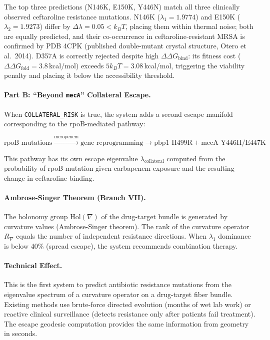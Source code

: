 \documentclass[11pt]{article}
\begin{document}
The top three predictions (N146K, E150K, Y446N) match all three clinically observed
ceftaroline resistance mutations. N146K ($\lambda_1 = 1.9774$) and E150K ($\lambda_2 = 1.9273$)
differ by $\Delta\lambda = 0.05 < k_BT$, placing them within thermal noise; both are
equally predicted, and their co-occurrence in ceftaroline-resistant MRSA is confirmed by
PDB 4CPK (published double-mutant crystal structure, Otero et al.~2014). D357A is
correctly rejected despite high $\Delta\Delta G_{\text{bind}}$: its fitness cost
($\Delta\Delta G_{\text{fold}} = 3.8$\,kcal/mol) exceeds $5k_BT = 3.08$\,kcal/mol,
triggering the viability penalty and placing it below the accessibility threshold.

\paragraph{Part B: ``Beyond \texttt{mecA}'' Collateral Escape.}
When \texttt{COLLATERAL\_RISK} is true, the system adds a second escape manifold
corresponding to the rpoB-mediated pathway:

\begin{equation}
\text{rpoB mutations} \xrightarrow{\text{meropenem}} \text{gene reprogramming}
\xrightarrow{} \text{pbp1 H499R} + \text{mecA Y446H/E447K}
\end{equation}

This pathway has its own escape eigenvalue $\lambda_{\text{collateral}}$ computed from the
probability of rpoB mutation given carbapenem exposure and the resulting change in
ceftaroline binding.

\paragraph{Ambrose-Singer Theorem (Branch VII).}
The holonomy group $\text{Hol}(\nabla)$ of the drug-target bundle is generated by curvature
values (Ambrose-Singer theorem). The rank of the curvature operator $R_\nabla$ equals the
number of independent resistance directions. When $\lambda_1$ dominance is below 40\%
(spread escape), the system recommends combination therapy.

\paragraph{Technical Effect.}
This is the first system to predict antibiotic resistance mutations from the eigenvalue
spectrum of a curvature operator on a drug-target fiber bundle. Existing methods use
brute-force directed evolution (months of wet lab work) or reactive clinical surveillance
(detects resistance only after patients fail treatment). The escape geodesic computation
provides the same information from geometry in seconds.
\end{document}
